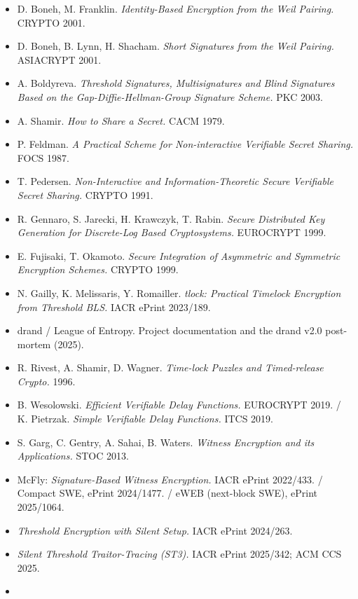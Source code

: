 \documentclass[
  11pt,
]{article}
\providecommand{\tightlist}{%
  \setlength{\itemsep}{0pt}\setlength{\parskip}{0pt}}
\begin{document}
\begin{itemize}
\tightlist
\item
  D. Boneh, M. Franklin. \emph{Identity-Based Encryption from the Weil
  Pairing.} CRYPTO 2001.
\item
  D. Boneh, B. Lynn, H. Shacham. \emph{Short Signatures from the Weil
  Pairing.} ASIACRYPT 2001.
\item
  A. Boldyreva. \emph{Threshold Signatures, Multisignatures and Blind
  Signatures Based on the Gap-Diffie-Hellman-Group Signature Scheme.}
  PKC 2003.
\item
  A. Shamir. \emph{How to Share a Secret.} CACM 1979.
\item
  P. Feldman. \emph{A Practical Scheme for Non-interactive Verifiable
  Secret Sharing.} FOCS 1987.
\item
  T. Pedersen. \emph{Non-Interactive and Information-Theoretic Secure
  Verifiable Secret Sharing.} CRYPTO 1991.
\item
  R. Gennaro, S. Jarecki, H. Krawczyk, T. Rabin. \emph{Secure
  Distributed Key Generation for Discrete-Log Based Cryptosystems.}
  EUROCRYPT 1999.
\item
  E. Fujisaki, T. Okamoto. \emph{Secure Integration of Asymmetric and
  Symmetric Encryption Schemes.} CRYPTO 1999.
\item
  N. Gailly, K. Melissaris, Y. Romailler. \emph{tlock: Practical
  Timelock Encryption from Threshold BLS.} IACR ePrint 2023/189.
\item
  drand / League of Entropy. Project documentation and the drand v2.0
  post-mortem (2025).
\item
  R. Rivest, A. Shamir, D. Wagner. \emph{Time-lock Puzzles and
  Timed-release Crypto.} 1996.
\item
  B. Wesolowski. \emph{Efficient Verifiable Delay Functions.} EUROCRYPT
  2019. / K. Pietrzak. \emph{Simple Verifiable Delay Functions.} ITCS
  2019.
\item
  S. Garg, C. Gentry, A. Sahai, B. Waters. \emph{Witness Encryption and
  its Applications.} STOC 2013.
\item
  McFly: \emph{Signature-Based Witness Encryption.} IACR ePrint
  2022/433. / Compact SWE, ePrint 2024/1477. / eWEB (next-block SWE),
  ePrint 2025/1064.
\item
  \emph{Threshold Encryption with Silent Setup.} IACR ePrint 2024/263.
\item
  \emph{Silent Threshold Traitor-Tracing (ST3).} IACR ePrint 2025/342;
  ACM CCS 2025.
\item

\end{itemize}
\end{document}
